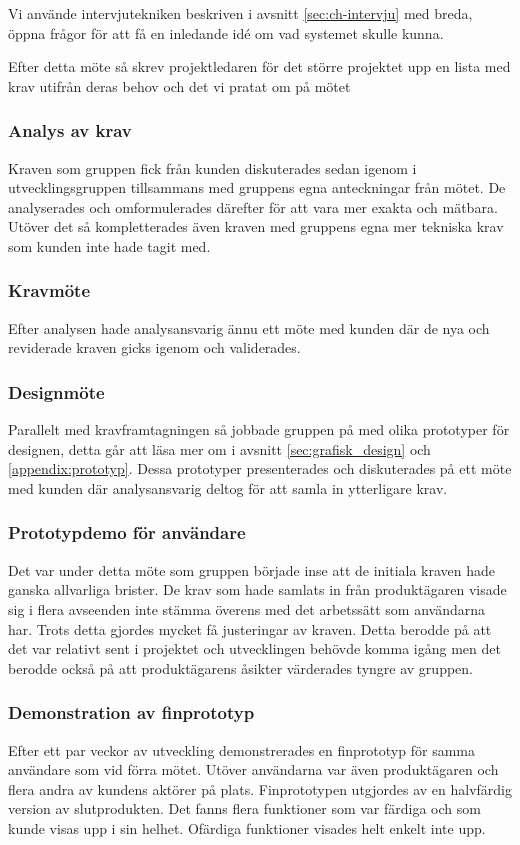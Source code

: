 Vi använde intervjutekniken beskriven i avsnitt \ref{sec:ch-intervju} med breda, öppna frågor för att få en inledande idé om vad systemet skulle kunna.

Efter detta möte så skrev projektledaren för det större projektet upp en lista med krav utifrån deras behov och det vi pratat om på mötet

\subsubsection{Analys av krav}
Kraven som gruppen fick från kunden diskuterades sedan igenom i utvecklingsgruppen tillsammans med gruppens egna anteckningar från mötet. De analyserades och omformulerades därefter för att vara mer exakta och mätbara. Utöver det så kompletterades även kraven med gruppens egna mer tekniska krav som kunden inte hade tagit med.

\subsubsection{Kravmöte}
Efter analysen hade analysansvarig ännu ett möte med kunden där de nya och reviderade kraven gicks igenom och validerades.

\subsubsection{Designmöte}
Parallelt med kravframtagningen så jobbade gruppen på med olika prototyper för designen, detta går att läsa mer om i avsnitt \ref{sec:grafisk_design} och \ref{appendix:prototyp}.
Dessa prototyper presenterades och diskuterades på ett möte med kunden där analysansvarig deltog för att samla in ytterligare krav.

\subsubsection{Prototypdemo för användare}
Det var under detta möte som gruppen började inse att de initiala kraven hade ganska allvarliga brister. De krav som hade samlats in från produktägaren visade sig i flera avseenden inte stämma överens med det arbetssätt som användarna har. Trots detta gjordes mycket få justeringar av kraven. Detta berodde på att det var relativt sent i projektet och utvecklingen behövde komma igång men det berodde också på att produktägarens åsikter värderades tyngre av gruppen.

\subsubsection{Demonstration av finprototyp}
Efter ett par veckor av utveckling demonstrerades en finprototyp för samma användare som vid förra mötet. Utöver användarna var även produktägaren och flera andra av kundens aktörer på plats. Finprototypen utgjordes av en halvfärdig version av slutprodukten. Det fanns flera funktioner som var färdiga och som kunde visas upp i sin helhet. Ofärdiga funktioner visades helt enkelt inte upp.


